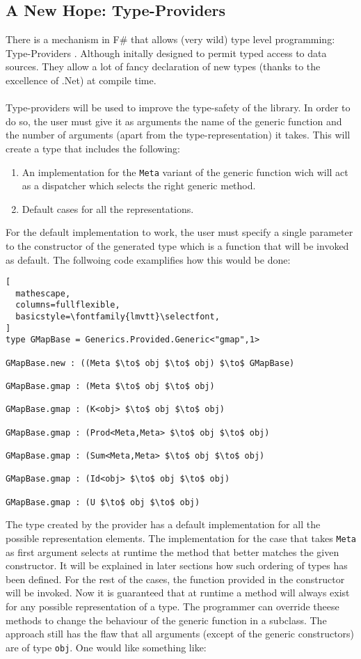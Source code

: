 \documentclass[8pt]{extarticle}
\begin{document}
\subsection{A New Hope: Type-Providers}
There is a mechanism in F\# that allows (very wild) type level programming: Type-Providers \cite{TypeProviders}. Although initally designed to permit typed access to data sources. They allow a lot of fancy declaration of new types (thanks to the excellence of .Net) at compile time.
\\\\
Type-providers will be used to improve the type-safety of the library. In order to do so, the user must give it as arguments the name of the generic function and the number of arguments (apart from the type-representation) it takes. This will create a type that includes the following:
\begin{enumerate}
\item An implementation for the \verb+Meta+ variant of the generic function wich will act as a dispatcher which selects the right generic method.
\item Default cases for all the representations.
\end{enumerate}
For the default implementation to work, the user must specify a single parameter to the constructor of the generated type which is a function that will be invoked as default. The follwoing code examplifies how this would be done:
\begin{lstlisting}[
  mathescape,
  columns=fullflexible,
  basicstyle=\fontfamily{lmvtt}\selectfont,
]
type GMapBase = Generics.Provided.Generic<"gmap",1>

GMapBase.new : ((Meta $\to$ obj $\to$ obj) $\to$ GMapBase)

GMapBase.gmap : (Meta $\to$ obj $\to$ obj)

GMapBase.gmap : (K<obj> $\to$ obj $\to$ obj)

GMapBase.gmap : (Prod<Meta,Meta> $\to$ obj $\to$ obj)

GMapBase.gmap : (Sum<Meta,Meta> $\to$ obj $\to$ obj)

GMapBase.gmap : (Id<obj> $\to$ obj $\to$ obj)

GMapBase.gmap : (U $\to$ obj $\to$ obj)

\end{lstlisting}
The type created by the provider has a default implementation for all the possible representation elements. The implementation for the case that takes \verb+Meta+ as first argument selects at runtime the method that better matches the given constructor. It will be explained in later sections how such ordering of types has been defined. For the rest of the cases, the function provided in the constructor will be invoked. Now it is guaranteed that at runtime a method will always exist for any possible representation of a type. The programmer can override theese methods to change the behaviour of the generic function in a subclass. The approach still has the flaw that all arguments (except of the generic constructors) are of type \verb+obj+. One would like something like:
\end{document}
